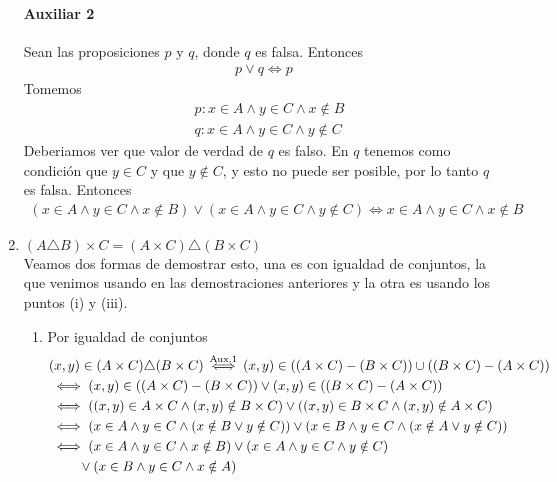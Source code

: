 \begin{enumerate}[label=\roman*)]
  \paragraph{Auxiliar 2}{
    Sean las proposiciones $p$ y $q$, donde $q$ es falsa. Entonces 
    \begin{align*}
      p \lor q \iff p
    \end{align*}
    Tomemos
    \begin{align*}
      &p: x \in A \land y \in C \land x \notin B \\
      &q: x \in A \land y \in C \land y \notin C
    \end{align*}
    Deberiamos ver que valor de verdad de $q$ es falso. En $q$ tenemos como condición que $y \in C$ y que $y \notin C$, 
    y esto no puede ser posible, por lo tanto $q$ es falsa. Entonces
    \begin{align*}
      (x \in A \land y \in C \land x \notin B) \lor (x \in A \land y \in C \land y \notin C) 
      \iff x \in A \land y \in C \land x \notin B
    \end{align*}
  }
  \item $(A \triangle B) \times C = (A \times C) \triangle (B \times C)$ \\
  Veamos dos formas de demostrar esto, una es con igualdad de conjuntos, la que venimos usando en las demostraciones 
  anteriores y la otra es usando los puntos (i) y (iii).
  \begin{enumerate}
    \item Por igualdad de conjuntos
    \begin{align*}
      &(x,y) \in (A \times C) \triangle (B \times C) 
      \overset{\text{Aux.1}}{\iff} (x,y) \in ((A \times C) - (B \times C)) \cup ((B \times C) - (A \times C)) \\
      &\iff (x,y) \in ((A \times C) - (B \times C)) \lor (x,y) \in ((B \times C) - (A \times C)) \\
      &\iff ((x,y) \in A \times C \land (x,y) \notin B \times C) 
      \lor ((x,y) \in B \times C \land (x,y) \notin A \times C) \\
      &\iff (x \in A \land y \in C \land (x \notin B \lor y \notin C)) 
      \lor (x \in B \land y \in C \land (x \notin A \lor y \notin C)) \\
      &\iff (x \in A \land y \in C \land x \notin B) \lor (x \in A \land y \in C \land y \notin C) \\
      &\phantom{\hspace{22px}} \lor (x \in B \land y \in C \land x \notin A) 

\end{align*}
\end{enumerate}
\end{enumerate}
